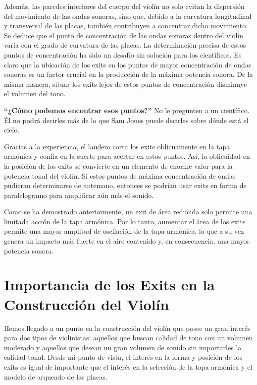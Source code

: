 \documentclass[12pt]{book}
\begin{document}
Además, las paredes interiores del cuerpo del violín no solo evitan la dispersión del movimiento de las ondas sonoras, sino que, debido a la curvatura longitudinal y transversal de las placas, también contribuyen a concentrar dicho movimiento. Se deduce que el punto de concentración de las ondas sonoras dentro del violín varía con el grado de curvatura de las placas. La determinación precisa de estos puntos de concentración ha sido un desafío sin solución para los científicos. Es claro que la ubicación de los exits en los puntos de mayor concentración de ondas sonoras es un factor crucial en la producción de la máxima potencia sonora. De la misma manera, situar los exits lejos de estos puntos de concentración disminuye el volumen del tono.

\textbf{“¿Cómo podemos encontrar esos puntos?”}  
No le pregunten a un científico.  
Él no podrá decirles más de lo que Sam Jones puede decirles sobre dónde está el cielo.

Gracias a la experiencia, el laudero corta los exits oblicuamente en la tapa armónica y confía en la suerte para acertar en estos puntos. Así, la oblicuidad en la posición de los exits se convierte en un elemento de enorme valor para la potencia tonal del violín. Si estos puntos de máxima concentración de ondas pudieran determinarse de antemano, entonces se podrían usar exits en forma de paralelogramo para amplificar aún más el sonido.

Como se ha demostrado anteriormente, un exit de área reducida solo permite una limitada acción de la tapa armónica. Por lo tanto, aumentar el área de los exits permite una mayor amplitud de oscilación de la tapa armónica, lo que a su vez genera un impacto más fuerte en el aire contenido y, en consecuencia, una mayor potencia sonora.

\section*{Importancia de los Exits en la Construcción del Violín}

Hemos llegado a un punto en la construcción del violín que posee un gran interés para dos tipos de violinistas: aquellos que buscan calidad de tono con un volumen moderado y aquellos que desean un gran volumen de sonido sin importarles la calidad tonal. Desde mi punto de vista, el interés en la forma y posición de los exits es igual de importante que el interés en la selección de la tapa armónica y el modelo de arqueado de las placas. 
\end{document}

